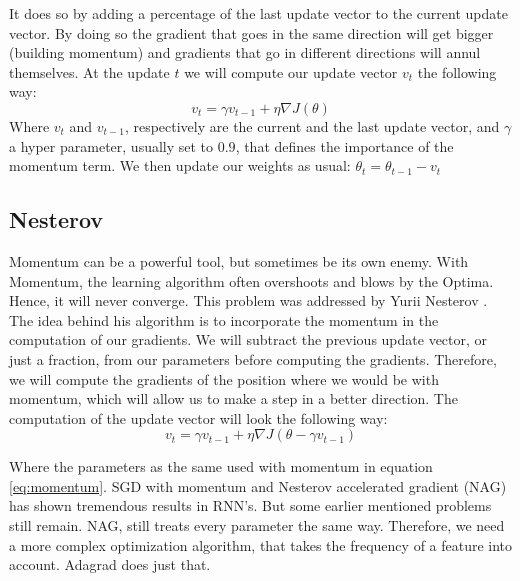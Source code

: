 It does so by adding a percentage of the last update vector to the current update vector. By doing so the gradient that goes in the same direction will get bigger (building momentum) and gradients that go in different directions will annul themselves.
At the update $t$ we will compute our update vector $v_t$ the following way:
\begin{equation}
v_t = \gamma v_{t-1} + \eta \nabla J (\theta)
\end{equation}\label{eq:momentum}
Where $v_t$ and $v_{t-1}$, respectively are the current and the last update vector, and $\gamma$ a hyper parameter, usually set to $0.9$, that defines the importance of the momentum term. We then update our weights as usual: $\theta_t = \theta_{t-1} - v_t$
\subsection{Nesterov}
Momentum can be a powerful tool, but sometimes be its own enemy. With Momentum, the learning algorithm often overshoots and blows by the Optima. Hence, it will never converge. This problem was addressed by Yurii Nesterov \cite{nag}. The idea behind his algorithm is to incorporate the momentum in the computation of our gradients. We will subtract the previous update vector, or just a fraction, from our parameters before computing the gradients. Therefore, we will compute the gradients of the position where we would be with momentum, which will allow us to make a step in a better direction. The computation of the update vector will look the following way:
\begin{equation}
v_t = \gamma v_{t-1} + \eta \nabla J (\theta - \gamma v_{t-1})
\end{equation}

Where the parameters as the same used with momentum in equation \ref{eq:momentum}. SGD with momentum and Nesterov accelerated gradient (NAG) has shown tremendous results in RNN's. But some earlier mentioned problems still remain. NAG, still treats every parameter the same way. Therefore, we need a more complex optimization algorithm, that takes the frequency of a feature into account. Adagrad does just that.

